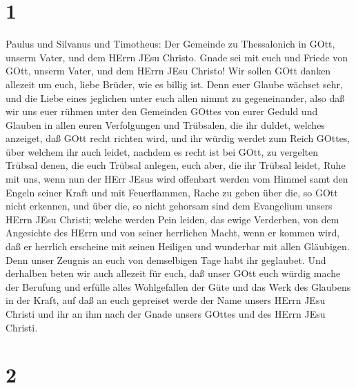 \hypertarget{section}{%
\section{1}\label{section}}

 Paulus und Silvanus und Timotheus: Der Gemeinde zu
Thessalonich in GOtt, unserm Vater, und dem HErrn JEsu Christo.
 Gnade sei mit euch und Friede von GOtt, unserm Vater, und
dem HErrn JEsu Christo!  Wir sollen GOtt danken allezeit um
euch, liebe Brüder, wie es billig ist. Denn euer Glaube wächset sehr,
und die Liebe eines jeglichen unter euch allen nimmt zu gegeneinander,
 also daß wir uns euer rühmen unter den Gemeinden GOttes von
eurer Geduld und Glauben in allen euren Verfolgungen und Trübsalen, die
ihr duldet,  welches anzeiget, daß GOtt recht richten wird,
und ihr würdig werdet zum Reich GOttes, über welchem ihr auch leidet,
 nachdem es recht ist bei GOtt, zu vergelten Trübsal denen,
die euch Trübsal anlegen,  euch aber, die ihr Trübsal
leidet, Ruhe mit uns, wenn nun der HErr JEsus wird offenbart werden vom
Himmel samt den Engeln seiner Kraft  und mit Feuerflammen,
Rache zu geben über die, so GOtt nicht erkennen, und über die, so nicht
gehorsam sind dem Evangelium unsers HErrn JEsu Christi; 
welche werden Pein leiden, das ewige Verderben, von dem Angesichte des
HErrn und von seiner herrlichen Macht,  wenn er kommen
wird, daß er herrlich erscheine mit seinen Heiligen und wunderbar mit
allen Gläubigen. Denn unser Zeugnis an euch von demselbigen Tage habt
ihr geglaubet.  Und derhalben beten wir auch allezeit für
euch, daß unser GOtt euch würdig mache der Berufung und erfülle alles
Wohlgefallen der Güte und das Werk des Glaubens in der Kraft,
 auf daß an euch gepreiset werde der Name unsers HErrn JEsu
Christi und ihr an ihm nach der Gnade unsers GOttes und des HErrn JEsu
Christi.

\hypertarget{section-1}{%
\section{2}\label{section-1}}

